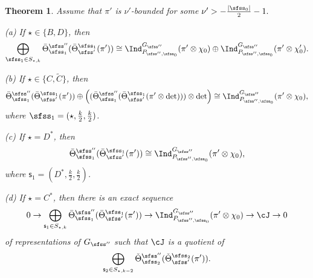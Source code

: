 \documentclass[12pt,a4paper]{amsart}
\def\abs#1{\left|{#1}\right|}
\numberwithin{equation}{section}
\newtheorem{thm}{Theorem}[section]
\theoremstyle{remark}
\def\Thetab{\bar{\Theta}}
\begin{document}
\begin{thm}\label{doubtt}
Assume that $\pi'$  is $\nu'$-bounded for some
$
  \nu'>
 -\frac{\abs{\sfss_0}}{2}-1.
$

\noindent
(a) If $\star\in \{B,D\}$,  then
\[
    \bigoplus_{\sfss_1\in S_{\star, k}}   \Thetab^{\sfss''}_{\sfss_1}(\Thetab^{\sfss_1}_{\sfss'}(\pi'))\cong \Ind_{P_{\sfss'',\sfss_0}}^{G_{\sfss''}} (\pi'\otimes \chi_0)
    \oplus  \Ind_{P_{\sfss'',\sfss_0}}^{G_{\sfss''}} (\pi' \otimes \chi'_0).
    \]

  \smallskip



    \noindent
(b) If $\star\in \{C,\widetilde C\}$, then
\[
 \Thetab^{\sfss''}_{\sfss_1}(\Thetab^{\sfss_1}_{\sfss'}(\pi'))\oplus\left(  (\Thetab^{\sfss''}_{\sfss_1}(\Thetab^{\sfss_1}_{\sfss'}(\pi'\otimes \det)))\otimes \det \right)\cong \Ind_{P_{\sfss'',\sfss_0}}^{G_{\sfss''}} (\pi'\otimes \chi_0),
\]
where $\sfss_1=(\star, \frac{k}{2},\frac{k}{2})$.
  \smallskip

\noindent
(c) If $\star=D^*$, then
\[
 \Thetab^{\sfss''}_{\sfss_1}(\Thetab^{\sfss_1}_{\sfss'}(\pi'))\cong \Ind_{P_{\sfss'',\sfss_0}}^{G_{\sfss''}} (\pi'\otimes \chi_0),
 \]
where $ \mathsf s_1=(D^*, \frac{k}{2}, \frac{k}{2})$.


\smallskip

\noindent
(d) If $\star=C^*$, then there is an exact sequence
\[
 0\rightarrow   \bigoplus_{\mathsf s_1\in S_{\star, k}}  \Thetab^{\sfss''}_{\sfss_1}(\Thetab^{\sfss_1}_{\sfss'}(\pi'))\rightarrow \Ind_{P_{\sfss'',\sfss_0}}^{G_{\sfss''}} (\pi'\otimes \chi_0)\rightarrow \cJ\rightarrow 0
\]
 of representations of $G_{\sfss''}$ such that $\cJ$ is a quotient of
\[
\bigoplus_{\mathsf s_2\in S_{\star, k-2}} \check \Theta^{\sfss''}_{\sfss_2}(\check \Theta^{\sfss_2}_{\sfss'}(\pi')).
\]
\end{thm}
\end{document}
